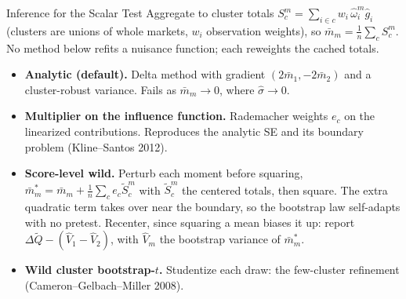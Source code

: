 \documentclass[aspectratio=169,10pt]{beamer}
\begin{document}
\begin{frame}{Inference for the Scalar Test}
\small
Aggregate to \alert{cluster totals} $S^m_c = \sum_{i \in c} w_i\, \widehat\omega^m_i \widehat g_i$ (clusters are unions of whole markets, $w_i$ observation weights), so $\bar m_m = \frac{1}{n}\sum_c S^m_c$. No method below refits a nuisance function; each reweights the cached totals.
\begin{itemize}
\item \textbf{Analytic (default).} Delta method with gradient $(2\bar m_1, -2\bar m_2)$ and a cluster-robust variance. Fails as $\bar m_m \rightarrow 0$, where $\widehat\sigma \rightarrow 0$.
\item \textbf{Multiplier on the influence function.} Rademacher weights $e_c$ on the linearized contributions. Reproduces the analytic SE and its boundary problem (Kline--Santos 2012).
\item \textbf{Score-level wild.} Perturb each moment \alert{before squaring}, $\bar m^*_m = \bar m_m + \frac{1}{n}\sum_c e_c \tilde S^m_c$ with $\tilde S^m_c$ the centered totals, then square. The extra quadratic term takes over near the boundary, so the bootstrap law self-adapts with no pretest. Recenter, since squaring a mean biases it up: report $\Delta\widetilde Q - (\widehat V_1 - \widehat V_2)$, with $\widehat V_m$ the bootstrap variance of $\bar m^*_m$.
\item \textbf{Wild cluster bootstrap-$t$.} Studentize each draw: the few-cluster refinement (Cameron--Gelbach--Miller 2008).
\end{itemize}
\end{frame}
\end{document}
